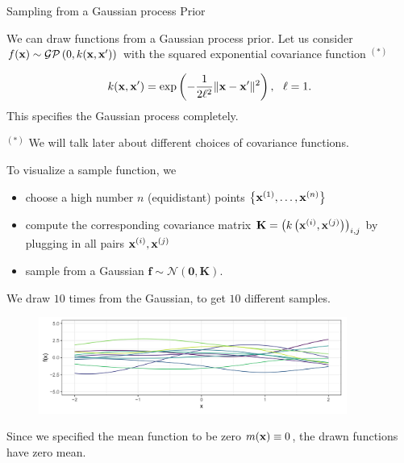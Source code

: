\begin{vbframe}{Sampling from a Gaussian process Prior}

We can draw functions from a Gaussian process prior. Let us consider $f(\mathbf{x}) \sim \mathcal{GP}\left(0, k(\mathbf{x}, \mathbf{x}^\prime)\right)$ with the squared exponential covariance function $^{(*)}$

$$
k(\mathbf{x}, \mathbf{x}^\prime) = \exp\left(-\frac{1}{2\ell^2}\|\mathbf{x} - \mathbf{x}^\prime\|^2\right), ~~ \ell = 1.
$$
\vspace{-4cm}
This specifies the Gaussian process completely. 

\vspace{8cm}
\footnotesize
$^{(*)}$ We will talk later about different choices of covariance functions. 

\normalsize

\framebreak 

To visualize a sample function, we 

\begin{itemize}
  \item choose a high number $n$ (equidistant) points $\left\{\mathbf{x}^{(1)}, \dots, \mathbf{x}^{(n)}\right\}$
  \item compute the corresponding covariance matrix $\mathbf{K} = \left(k\left(\mathbf{x}^{(i)}, \mathbf{x}^{(j)}\right)\right)_{i,j}$ by plugging in all pairs $\mathbf{x}^{(i)}, \mathbf{x}^{(j)}$ 
  \item sample from a Gaussian $\bm{f} \sim \mathcal{N}(\bm{0}, \bm{K})$. 
\end{itemize}

We draw $10$ times from the Gaussian, to get $10$ different samples.  



\begin{figure}
  \includegraphics[width=0.9\textwidth]{figure_man/different-samples.png}
\end{figure}

\vspace{-0.2cm}
Since we specified the mean function to be zero $m(\mathbf{x}) \equiv 0$, the drawn functions have zero mean.

\end{vbframe}


